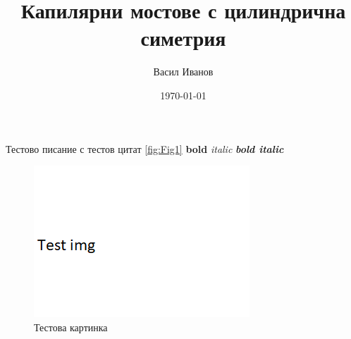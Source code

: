 \documentclass[12pt]{article}
\title{Капилярни мостове с цилиндрична симетрия}
\author{Васил Иванов }
\date{\today}
\begin{document}
    Тестово писание с тестов цитат
    \cite{directSynth}
    \autoref{fig:Fig1}
    \textbf{bold}
    \textit{italic}
    \textbf{\textit{bold italic}}
    \begin{figure}
        \centering
        \includegraphics[width=0.5\linewidth]{imgs/test.png}
        \caption{Тестова картинка}
        \label{fig:Fig1}
    \end{figure}
    \printbibliography
\end{document}
